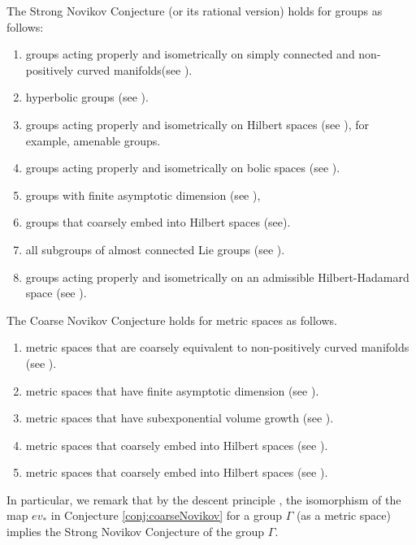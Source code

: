 \documentclass[12pt, reqno]{amsart}
\theoremstyle{plain}%
\theoremstyle{definition}
\theoremstyle{remark}
\numberwithin{equation}{section}
\newcommand{\ev}{ev}
\begin{document}
The Strong Novikov Conjecture (or its rational version) holds for groups as follows:
\begin{enumerate}
	\item \label{list: npc} groups acting properly and isometrically on simply connected and non-positively curved manifolds(see \cite[Section 5.3]{GK88}).
	\item \label{list: hyperbolic}hyperbolic groups (see \cite[Theorem 6.8]{ConnesMoscovici}).
	\item \label{list: Hilbert}groups acting properly and isometrically on Hilbert spaces (see \cite[Theorem 1.1]{MR1821144}), for example, amenable groups.
	\item groups acting properly and isometrically on bolic spaces (see \cite[Theorem 1.1]{MR1998480}).
	\item \label{list: FSD}groups with finite asymptotic dimension (see \cite[Corollary 7.2]{Yu}),
	\item groups that coarsely embed into Hilbert spaces (see\cite[Corollary 1.2]{Yucoarseembed}).
    \item all subgroups of almost connected Lie groups (see \cite{MR2217050}).
    \item groups acting properly and isometrically on an admissible Hilbert-Hadamard space (see \cite[Theorem 1.1]{MR4268302}).
\end{enumerate}

The Coarse Novikov Conjecture holds for metric spaces as follows.
\begin{enumerate}
	\item metric spaces that are coarsely equivalent to non-positively curved manifolds (see \cite[Section 4]{Yulocalization}).
	\item metric spaces that have finite asymptotic dimension (see \cite[Theorem 1.1]{Yu}).
    \item metric spaces that have subexponential volume growth (see \cite[Theorem 5.1]{MR1791141}).
	\item metric spaces that coarsely embed into Hilbert spaces (see \cite[Theorem 1.1]{Yucoarseembed}).
    \item metric spaces that coarsely embed into Hilbert spaces (see \cite[Theorem 1.1]{MR3325537}).
\end{enumerate}

In particular, we remark that by the descent principle \cite[Theorem 8.4]{Roe}, the isomorphism of the map $\ev_*$ in Conjecture \ref{conj:coarseNovikov} for a group $\Gamma$ (as a metric space) implies the Strong Novikov Conjecture of the group $\Gamma$. 
\end{document}
